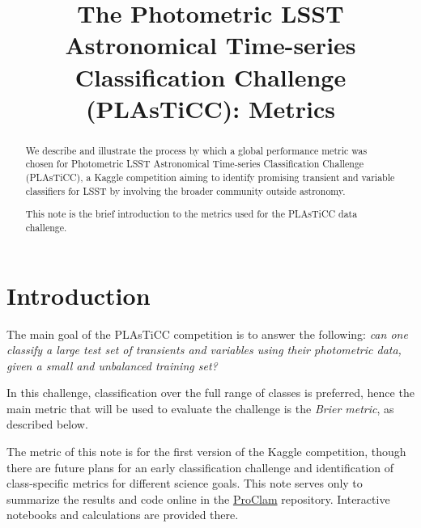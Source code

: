 \documentclass[\docopts]{\docclass}
\begin{document}
\title{The Photometric LSST Astronomical Time-series Classification Challenge (PLAsTiCC): Metrics}

\maketitlepre

\begin{abstract}
We describe and illustrate the process by which a global performance metric was chosen for Photometric LSST Astronomical Time-series Classification Challenge (PLAsTiCC), a Kaggle competition aiming to identify promising transient and variable classifiers for LSST by involving the broader community outside astronomy.

This note is the brief introduction to the metrics used for the PLAsTiCC data challenge.
\end{abstract}

\dockeys{}

\maketitlepost


\section{Introduction}
\label{sec:intro}

The main goal of the PLAsTiCC competition is to answer the following: \textit{can one classify a large test set of transients and variables using their photometric data, given a small and unbalanced training set?}

In this challenge, classification over the full range of classes is preferred, hence the main metric that will be used to evaluate the challenge is the \textit{Brier metric}, as described below.

The metric of this note is for the first version of the Kaggle competition, though there are future plans for an early classification challenge and identification of class-specific metrics for different science goals. This note serves only to summarize the results and code online in the \href{https://github.com/aimalz/proclam/}{ProClam} repository. Interactive notebooks and calculations are provided there.
\end{document}
